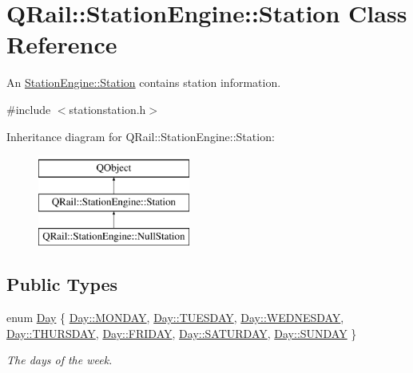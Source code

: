 \hypertarget{classQRail_1_1StationEngine_1_1Station}{}\section{Q\+Rail\+::Station\+Engine\+::Station Class Reference}
\label{classQRail_1_1StationEngine_1_1Station}


An \mbox{\hyperlink{classQRail_1_1StationEngine_1_1Station}{Station\+Engine\+::\+Station}} contains station information.  




{\ttfamily \#include $<$stationstation.\+h$>$}

Inheritance diagram for Q\+Rail\+::Station\+Engine\+::Station\+:\begin{figure}[H]
\begin{center}
\leavevmode
\includegraphics[height=3.000000cm]{classQRail_1_1StationEngine_1_1Station}
\end{center}
\end{figure}
\subsection*{Public Types}
\begin{DoxyCompactItemize}
\item 
enum \mbox{\hyperlink{classQRail_1_1StationEngine_1_1Station_ae8c109a1d5ce2bb41959e62e32392631}{Day}} \{ \newline
\mbox{\hyperlink{classQRail_1_1StationEngine_1_1Station_ae8c109a1d5ce2bb41959e62e32392631a98617021b249af0ace0f84ee92ccc7cd}{Day\+::\+M\+O\+N\+D\+AY}}, 
\mbox{\hyperlink{classQRail_1_1StationEngine_1_1Station_ae8c109a1d5ce2bb41959e62e32392631a5f5140afce13197a89e848004f292f14}{Day\+::\+T\+U\+E\+S\+D\+AY}}, 
\mbox{\hyperlink{classQRail_1_1StationEngine_1_1Station_ae8c109a1d5ce2bb41959e62e32392631aaaebdc947e9f7d4ea362e5dc4fe7f825}{Day\+::\+W\+E\+D\+N\+E\+S\+D\+AY}}, 
\mbox{\hyperlink{classQRail_1_1StationEngine_1_1Station_ae8c109a1d5ce2bb41959e62e32392631a7a61b324afb4dd8b2fb4a38afc34f755}{Day\+::\+T\+H\+U\+R\+S\+D\+AY}}, 
\newline
\mbox{\hyperlink{classQRail_1_1StationEngine_1_1Station_ae8c109a1d5ce2bb41959e62e32392631a86fb6d343289267f3e9edb9b7403d936}{Day\+::\+F\+R\+I\+D\+AY}}, 
\mbox{\hyperlink{classQRail_1_1StationEngine_1_1Station_ae8c109a1d5ce2bb41959e62e32392631afd5ae113ac00b67f69541bc8c7f21ef7}{Day\+::\+S\+A\+T\+U\+R\+D\+AY}}, 
\mbox{\hyperlink{classQRail_1_1StationEngine_1_1Station_ae8c109a1d5ce2bb41959e62e32392631a95fa12cb2100ce7081b71f7c44bc12a5}{Day\+::\+S\+U\+N\+D\+AY}}
 \}
\begin{DoxyCompactList}\small\item\em The days of the week. \end{DoxyCompactList}\end{DoxyCompactItemize}
